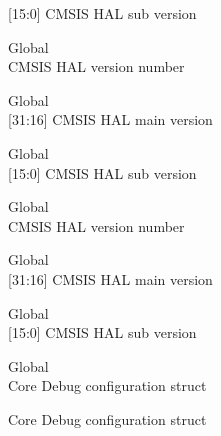 \begin{DoxyRefList}
\label{deprecated__deprecated000553}%
%
\mbox{[}15\+:0\mbox{]} CMSIS HAL sub version  
\item[Global \doxylink{core__sc000_8h_a794ed22b926ab39924705178f2441270}{\+\_\+\+\_\+\+SC000\+\_\+\+CMSIS\+\_\+\+VERSION} ]\hfill \\
\label{deprecated__deprecated000656}%
%
CMSIS HAL version number  
\item[Global \doxylink{core__sc000_8h_a9cca46bbd181abedd1cd6e84ef0b3cf4}{\+\_\+\+\_\+\+SC000\+\_\+\+CMSIS\+\_\+\+VERSION\+\_\+\+MAIN} ]\hfill \\
\label{deprecated__deprecated000654}%
%
\mbox{[}31\+:16\mbox{]} CMSIS HAL main version  
\item[Global \doxylink{core__sc000_8h_af4db9bbe5ff5726d8a8c388e52d5685d}{\+\_\+\+\_\+\+SC000\+\_\+\+CMSIS\+\_\+\+VERSION\+\_\+\+SUB} ]\hfill \\
\label{deprecated__deprecated000655}%
%
\mbox{[}15\+:0\mbox{]} CMSIS HAL sub version  
\item[Global \doxylink{core__sc300_8h_a2f960c3c99ab33e1cf4b5287821c44dd}{\+\_\+\+\_\+\+SC300\+\_\+\+CMSIS\+\_\+\+VERSION} ]\hfill \\
\label{deprecated__deprecated000659}%
%
CMSIS HAL version number  
\item[Global \doxylink{core__sc300_8h_a0e2124db4f74f2b355904314accf1790}{\+\_\+\+\_\+\+SC300\+\_\+\+CMSIS\+\_\+\+VERSION\+\_\+\+MAIN} ]\hfill \\
\label{deprecated__deprecated000657}%
%
\mbox{[}31\+:16\mbox{]} CMSIS HAL main version  
\item[Global \doxylink{core__sc300_8h_a664c9e59952455ddeee28173b864fe9d}{\+\_\+\+\_\+\+SC300\+\_\+\+CMSIS\+\_\+\+VERSION\+\_\+\+SUB} ]\hfill \\
\label{deprecated__deprecated000658}%
%
\mbox{[}15\+:0\mbox{]} CMSIS HAL sub version  
\item[Global \doxylink{group___c_m_s_i_s___core_debug_gab6e30a2b802d9021619dbb0be7f5d63d}{Core\+Debug} ]\hfill \\
\label{deprecated__deprecated000100}%
%
Core Debug configuration struct 

\label{deprecated__deprecated000154}%
%
Core Debug configuration struct 


\end{DoxyRefList}
